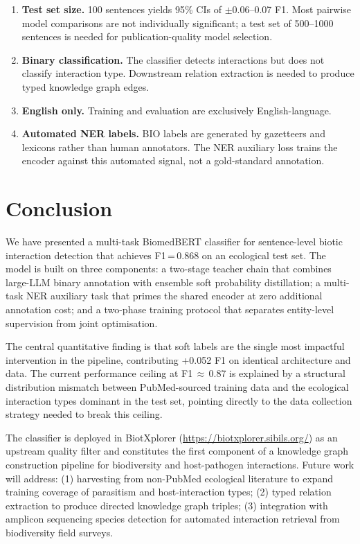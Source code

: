 \documentclass[12pt,a4paper]{article}
\begin{document}
\begin{enumerate}
    \item \textbf{Test set size.} 100 sentences yields 95\% CIs of
    $\pm$0.06--0.07 F1. Most pairwise model comparisons are not individually
    significant; a test set of 500--1000 sentences is needed for
    publication-quality model selection.

    \item \textbf{Binary classification.} The classifier detects interactions
    but does not classify interaction type. Downstream relation extraction
    is needed to produce typed knowledge graph edges.

    \item \textbf{English only.} Training and evaluation are exclusively
    English-language.

    \item \textbf{Automated NER labels.} BIO labels are generated by gazetteers
    and lexicons rather than human annotators. The NER auxiliary loss trains
    the encoder against this automated signal, not a gold-standard annotation.
\end{enumerate}

\section{Conclusion}

We have presented a multi-task BiomedBERT classifier for sentence-level
biotic interaction detection that achieves F1\,=\,0.868 on an ecological
test set. The model is built on three components: a two-stage teacher chain
that combines large-LLM binary annotation with ensemble soft probability
distillation; a multi-task NER auxiliary task that primes the shared encoder
at zero additional annotation cost; and a two-phase training protocol that
separates entity-level supervision from joint optimisation.

The central quantitative finding is that soft labels are the single most
impactful intervention in the pipeline, contributing +0.052 F1 on identical
architecture and data. The current performance ceiling at F1\,$\approx$\,0.87
is explained by a structural distribution mismatch between PubMed-sourced
training data and the ecological interaction types dominant in the test set,
pointing directly to the data collection strategy needed to break this ceiling.

The classifier is deployed in BiotXplorer
(\url{https://biotxplorer.sibils.org/}) as an upstream quality filter
and constitutes the first component of a knowledge graph construction
pipeline for biodiversity and host-pathogen interactions. Future work
will address: (1) harvesting from non-PubMed ecological literature to
expand training coverage of parasitism and host-interaction types;
(2) typed relation extraction to produce directed knowledge graph triples;
(3) integration with amplicon sequencing species detection for automated
interaction retrieval from biodiversity field surveys.
\end{document}
